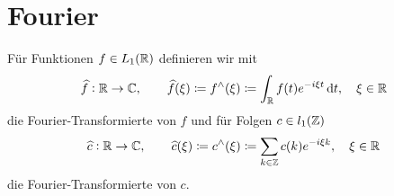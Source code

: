 \section{Fourier}

\begin{definition} \label{def:Fourier-Transformation}
Für Funktionen $ f \in L_{1}(\mathbb{R}) $ definieren wir mit
\[
  \widehat{f} : \R \rightarrow \C, \qquad
  \widehat{f}(\xi) \coloneqq f^{\wedge}(\xi) \coloneqq 
  \int_{\R} f(t) e^{-i\xi t} \dif t, \quad \xi \in \R
\]
die Fourier-Transformierte von $ f $ und für Folgen $ c \in l_{1}(\mathbb{Z}) $
\[
  \widehat{c} : \mathbb{R} \rightarrow \mathbb{C}, \qquad
  \widehat{c}(\xi) \coloneqq c^{\wedge}(\xi) \coloneqq 
  \sum_{k \in \mathbb{Z}} c(k) e^{-i\xi k}, \quad \xi \in \mathbb{R}
\]
die Fourier-Transformierte von $ c $.
\end{definition}

